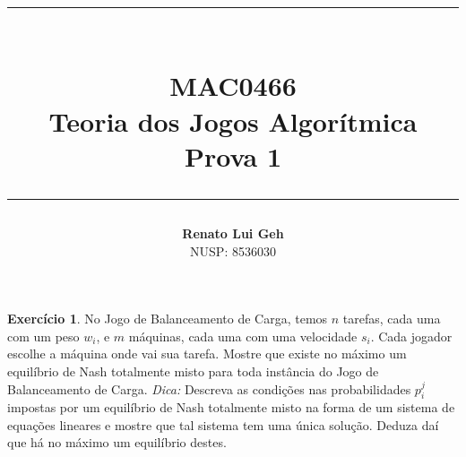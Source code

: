 \documentclass{amsart}
\title{%
  \noindent\rule{13cm}{1.0pt}\\
  \vspace{0.2cm}
  MAC0466\\
  Teoria dos Jogos Algorítmica\\
  Prova 1
  \noindent\rule{13cm}{0.8pt}
}
\author[]{\normalsize\textbf{Renato Lui Geh}\\\small NUSP\@: 8536030}
\theoremstyle{plain}
\theoremstyle{definition}
\newtheorem{exercise}{Exercício}
\numberwithin{equation}{section}
\begin{document}
\maketitle

\setcounter{exercise}{1}
\setcounter{answer}{1}
\begin{exercise}
  No Jogo de Balanceamento de Carga, temos $n$ tarefas, cada uma com um peso $w_i$, e $m$ máquinas,
  cada uma com uma velocidade $s_i$. Cada jogador escolhe a máquina onde vai sua tarefa. Mostre que
  existe no máximo um equilíbrio de Nash totalmente misto para toda instância do Jogo de
  Balanceamento de Carga. \textit{Dica:} Descreva as condições nas probabilidades $p_i^j$ impostas
  por um equilíbrio de Nash totalmente misto na forma de um sistema de equações lineares e mostre
  que tal sistema tem uma única solução. Deduza daí que há no máximo um equilíbrio destes.
\end{exercise}
\end{document}
